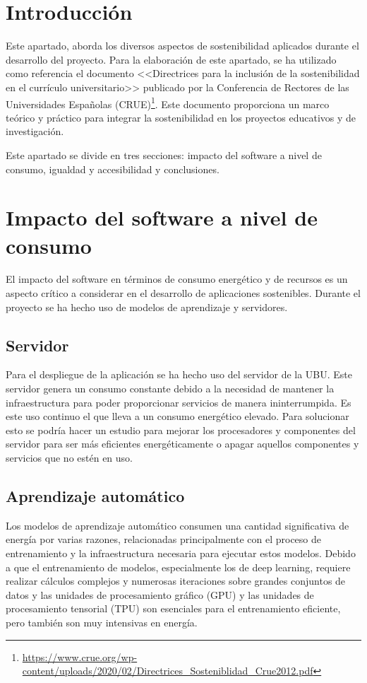 
\section{Introducción}
Este apartado, aborda los diversos aspectos de sostenibilidad aplicados durante el desarrollo del proyecto.
Para la elaboración de este apartado, se ha utilizado como referencia el documento <<Directrices para la inclusión de la sostenibilidad en el currículo universitario>> publicado por la Conferencia de Rectores de las Universidades Españolas (CRUE)\footnote{\url{https://www.crue.org/wp-content/uploads/2020/02/Directrices_Sosteniblidad_Crue2012.pdf}}. Este documento proporciona un marco teórico y práctico para integrar la sostenibilidad en los proyectos educativos y de investigación. 

Este apartado se divide en tres secciones: impacto del software a nivel de consumo, igualdad y accesibilidad y conclusiones.

\section{Impacto del software a nivel de consumo}
El impacto del software en términos de consumo energético y de recursos es un aspecto crítico a considerar en el desarrollo de aplicaciones sostenibles. Durante el proyecto se ha hecho uso de modelos de aprendizaje y servidores.

\subsection{Servidor}

Para el despliegue de la aplicación se ha hecho uso del servidor de la UBU. Este servidor genera un consumo constante debido a la necesidad de mantener la infraestructura para poder proporcionar servicios de manera ininterrumpida. Es este uso continuo el que lleva a un consumo energético elevado. Para solucionar esto se podría hacer un estudio para mejorar los procesadores y componentes del servidor para ser más eficientes energéticamente o apagar aquellos componentes y servicios que no estén en uso.

\subsection{Aprendizaje automático}

Los modelos de aprendizaje automático consumen una cantidad significativa de energía por varias razones, relacionadas principalmente con el proceso de entrenamiento y la infraestructura necesaria para ejecutar estos modelos. Debido a que el entrenamiento de modelos, especialmente los de deep learning, requiere realizar cálculos complejos y numerosas iteraciones sobre grandes conjuntos de datos y las unidades de procesamiento gráfico (GPU) y las unidades de procesamiento tensorial (TPU) son esenciales para el entrenamiento eficiente, pero también son muy intensivas en energía.


